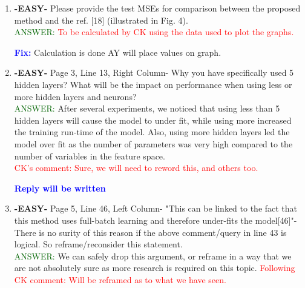 \documentclass{article}
\newcommand{\fix}{\large \textcolor{blue}{ \textbf{Fix:} }}
\newcommand{\reply}{\large \textcolor{blue}{ \textbf{Reply will be written} }}
\begin{document}
\begin{enumerate}
\fix The names should be checked

\item \textbf{-EASY-} Please provide the test MSEs for comparison between the proposed method and the ref. [18] (illustrated in Fig. 4).   \\
\textcolor{darkgreen}{ANSWER: }  \textcolor{red}{To be calculated by CK using the data used to plot the graphs.}

\fix Calculation is done AY will place values on graph.
    
    \item \textbf{-EASY-} Page 3, Line 13, Right Column- Why you have specifically used 5 hidden layers? What will be the impact on performance when using less or more hidden layers and neurons?\\
    \textcolor{darkgreen}{ANSWER: } After several experiments, we noticed that using less than 5 hidden layers will cause the model to under fit, while using more increased the training run-time of the model. Also, using more hidden layers led the model over fit as the number of parameters was very high compared to the number of variables in the feature space.  \\ \textcolor{red}{ CK's comment: Sure, we will need to reword this, and others too.}
    
    \reply

   
	\item \textbf{-EASY-} Page 5, Line 46, Left Column- "This can be linked to the fact that this method uses full-batch learning and therefore under-fits the model[46]"- There is no surity of this reason if the above comment/query in line 43 is logical. So reframe/reconsider this statement. \\
	
	\textcolor{darkgreen}{ANSWER: } We can safely drop this argument, or reframe in a way that we are not absolutely sure as more research is required on this topic. \textcolor{red}{Following CK comment: Will be reframed as to what we have seen.}


\end{enumerate}
\end{document}
